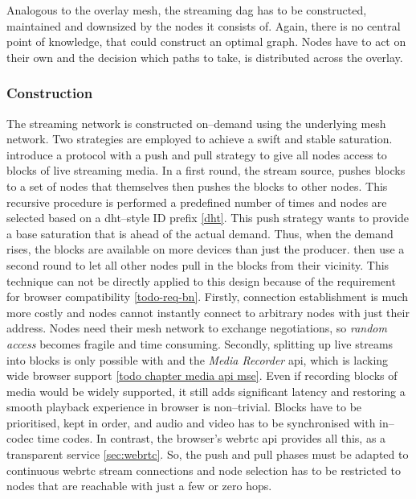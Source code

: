 Analogous to the overlay mesh, the streaming \gls{dag} has to be constructed, maintained and downsized by the nodes it consists of. Again, there is no central point of knowledge, that could construct an optimal graph. Nodes have to act on their own and the decision which paths to take, is distributed across the overlay.

\subsubsection{Construction}\label{sec:design-stream-construction}
The streaming network is constructed on–demand using the underlying mesh network. Two strategies are employed to achieve a swift and stable saturation.
\citet*[\S3]{push-to-pull} introduce a protocol with a push and pull strategy to give all nodes access to blocks of live streaming media. In a first round, the stream source, pushes blocks to a set of nodes that themselves then pushes the blocks to other nodes. This recursive procedure is performed a predefined number of times and nodes are selected based on a \gls{dht}–style ID prefix \ref{dht}. This push strategy wants to provide a base saturation that is ahead of the actual demand. Thus, when the demand rises, the blocks are available on more devices than just the producer. \citet{push-to-pull} then use a second round to let all other nodes pull in the blocks from their vicinity. This technique can not be directly applied to this design because of the requirement for browser compatibility \ref{todo-req-bn}. Firstly, connection establishment is much more costly and nodes cannot instantly connect to arbitrary nodes with just their address. Nodes need their mesh network to exchange negotiations, so \textit{random access} becomes fragile and time consuming.
Secondly, splitting up live streams into blocks is only possible with  and the \textit{Media Recorder} \gls{api}, which is lacking wide browser support \ref{todo chapter media api mse}. Even if recording blocks of media would be widely supported, it still adds significant latency and restoring a smooth playback experience in browser is non–trivial. Blocks have to be prioritised, kept in order, and audio and video has to be synchronised with in–codec time codes.
In contrast, the browser's \gls{webrtc} \gls{api} provides all this, as a transparent service \ref{sec:webrtc}.
So, the push and pull phases must be adapted to continuous \gls{webrtc} stream connections and node selection has to be restricted to nodes that are reachable with just a few or zero hops.

